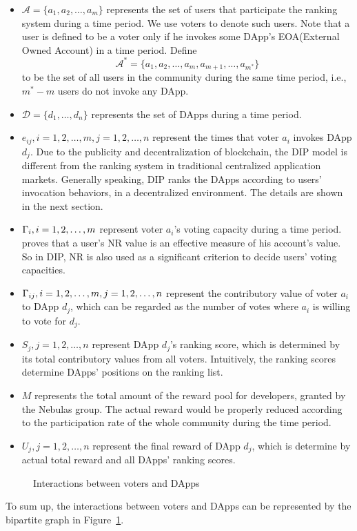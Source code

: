 \begin{itemize}
	\item $\mathcal{A}=\{a_1,a_2,\ldots,a_m\}$ represents the set of users that
	  participate the ranking system during a time period. We use voters to
	  denote such users. Note that a user is defined to be a voter only if he
	  invokes some DApp's EOA(External Owned Account) in a time period. Define
	  $$\mathcal{A}^*=\{a_1,a_2,\ldots,a_m,a_{m+1},\ldots,a_{m^*}\}$$
	to be the set of all users in the community during the same time period, i.e., $m^*-m$ users do not invoke any DApp.
  \item $\mathcal{D}=\{d_1,\ldots,d_n\}$ represents the set of DApps during a time period.
  \item $e_{ij},i=1,2,\ldots,m, j=1,2,\ldots,n$ represent the times that voter $a_i$ invokes DApp $d_j$. Due to the publicity and decentralization of blockchain, the DIP model is different from the ranking system in traditional centralized application markets. Generally speaking, DIP ranks the DApps according to users' invocation behaviors, in a decentralized environment. The details are shown in the next section.

  \item $\Gamma_i, i=1,2,\ldots,m$ represent voter $a_i$'s voting capacity during a time period.
  \cite{Nebulasyellowpaper} proves that a user's NR value is an effective measure of his account's value. So in DIP, NR is also used as a significant criterion to decide users' voting capacities.
  \item $\Gamma_{ij}, i=1,2,\ldots,m,j=1,2,\ldots,n$ represent the contributory value of voter $a_i$ to DApp $d_j$, which can be regarded as the number of votes where $a_i$ is willing to vote for $d_j$.

  \item $S_j, j=1,2,\ldots,n$ represent DApp $d_j$'s ranking score, which is determined by its total contributory values from all voters. Intuitively, the ranking scores determine DApps' positions on the ranking list.

  	\item $M$ represents the total amount of the reward pool for developers, granted by the Nebulas group.  The actual reward would be properly reduced according to the participation rate of the whole community during the time period.
   \item $U_j, j=1,2,\ldots,n$ represent the final reward of DApp $d_j$, which is determine by actual total reward and all DApps' ranking scores.
 \end{itemize}
   \begin{figure}
   	\centering
   	
   	\caption{Interactions between voters and DApps \label{fig:interact}}
   \end{figure}
  To sum up, the interactions between voters and DApps can be represented by the bipartite graph in Figure~\ref{fig:interact}.

